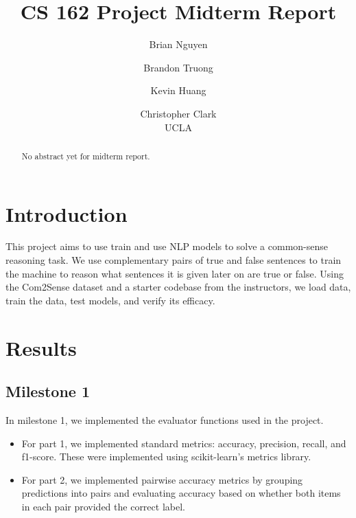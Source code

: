 \documentclass[11pt]{article}
\title{CS 162 Project Midterm Report}
\author{Brian Nguyen \and Brandon Truong \and 
Kevin Huang \and Christopher Clark
 \\ UCLA  \\}
\begin{document}
\maketitle
\begin{abstract}
No abstract yet for midterm report.
\end{abstract}

\section{Introduction}

This project aims to use train and use NLP models to solve a common-sense reasoning task. We use complementary pairs of true and false sentences to train the machine to reason what sentences it is given later on are true or false. Using the Com2Sense dataset and a starter codebase from the instructors, we load data, train the data, test models, and verify its efficacy.


\section{Results}

\subsection{Milestone 1}

In milestone 1, we implemented the evaluator functions used in the project. 

\begin{itemize}
    \item For part 1, we implemented standard metrics: accuracy, precision, recall, and f1-score. These were implemented using scikit-learn's metrics library. 

    \item For part 2, we implemented pairwise accuracy metrics by grouping predictions into pairs and evaluating accuracy based on whether both items in each pair provided the correct label. 
\end{itemize}
\end{document}

